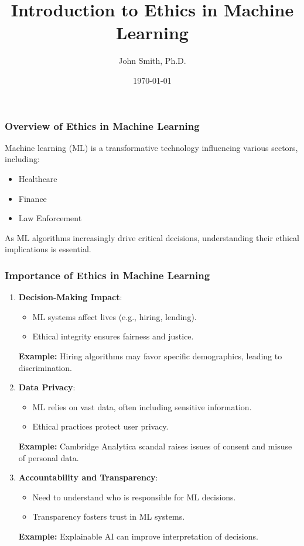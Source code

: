 \documentclass[aspectratio=169]{beamer}
\begin{document}
\frame{\titlepage}

\begin{frame}[fragile]
    \title{Introduction to Ethics in Machine Learning}
    \author{John Smith, Ph.D.}
    \date{\today}
    \maketitle
\end{frame}

\begin{frame}[fragile]
    \frametitle{Overview of Ethics in Machine Learning}
    Machine learning (ML) is a transformative technology influencing various sectors, including:
    \begin{itemize}
        \item Healthcare
        \item Finance
        \item Law Enforcement
    \end{itemize}
    As ML algorithms increasingly drive critical decisions, understanding their ethical implications is essential.
\end{frame}

\begin{frame}[fragile]
    \frametitle{Importance of Ethics in Machine Learning}
    \begin{enumerate}
        \item \textbf{Decision-Making Impact}:
            \begin{itemize}
                \item ML systems affect lives (e.g., hiring, lending).
                \item Ethical integrity ensures fairness and justice.
            \end{itemize}
            \textbf{Example:} Hiring algorithms may favor specific demographics, leading to discrimination.
            
        \item \textbf{Data Privacy}:
            \begin{itemize}
                \item ML relies on vast data, often including sensitive information.
                \item Ethical practices protect user privacy.
            \end{itemize}
            \textbf{Example:} Cambridge Analytica scandal raises issues of consent and misuse of personal data.

        \item \textbf{Accountability and Transparency}:
            \begin{itemize}
                \item Need to understand who is responsible for ML decisions.
                \item Transparency fosters trust in ML systems.
            \end{itemize}
            \textbf{Example:} Explainable AI can improve interpretation of decisions.
    \end{enumerate}
\end{frame}
\end{document}
